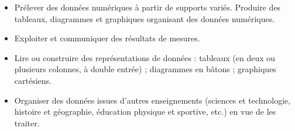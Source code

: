 \begin{prerequis}    
    \begin{itemize}
        \item[\emoji{diamond-suit}] Prélever des données numériques à partir de supports variés. Produire des tableaux, diagrammes et graphiques organisant des données numériques.
        \item[\emoji{diamond-suit}] Exploiter et communiquer des résultats de mesures.
        \columnbreak
        \item[\emoji{diamond-suit}] Lire ou construire des représentations de données : tableaux (en deux ou plusieurs colonnes, à double entrée) ; diagrammes en bâtons ; graphiques cartésiens.
        \item[\emoji{diamond-suit}] Organiser des données issues d’autres enseignements (sciences et technologie, histoire et géographie, éducation physique et sportive, etc.) en vue de les traiter.
    \end{itemize}
\end{prerequis}